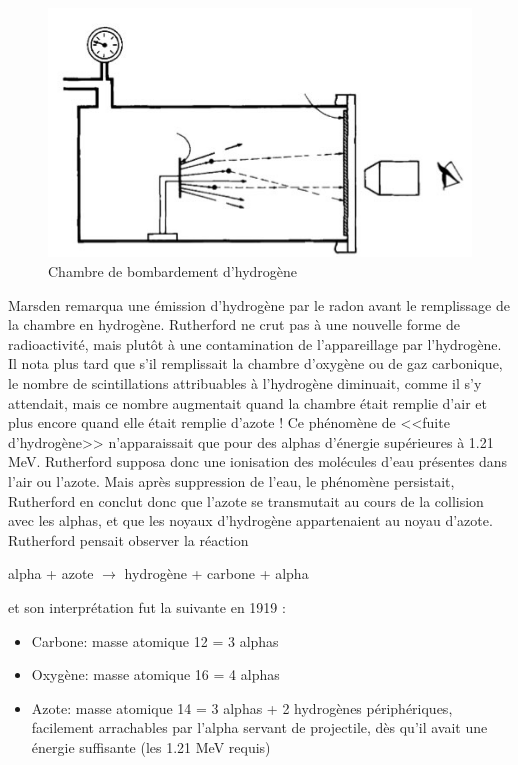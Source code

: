\begin{figure}[ht]
    \centering
    \includegraphics[scale=0.75]{Images1/bombardement.PNG}
    \caption{Chambre de bombardement d'hydrogène}
    \label{fig:chambre_bombardement_H}
\end{figure}

Marsden remarqua une émission d'hydrogène par le radon avant le remplissage de la chambre en hydrogène. Rutherford ne crut pas à une nouvelle forme de radioactivité, mais plutôt à une contamination de l'appareillage par l'hydrogène. Il nota plus tard que s'il remplissait la chambre d'oxygène ou de gaz carbonique, le nombre de scintillations attribuables à l'hydrogène diminuait, comme il s'y attendait, mais ce nombre augmentait quand la chambre était remplie d'air et plus encore quand elle était remplie d'azote ! Ce phénomène de <<fuite d'hydrogène>> n'apparaissait que pour des alphas d'énergie supérieures à 1.21 \si{MeV}. Rutherford supposa donc une ionisation des molécules d'eau présentes dans l'air ou l'azote. Mais après suppression de l'eau, le phénomène persistait, Rutherford en conclut donc que l'azote se transmutait au cours de la collision avec les alphas, et que les noyaux d'hydrogène appartenaient au noyau d'azote. Rutherford pensait observer la réaction
\begin{center}
    alpha + azote $\longrightarrow$ hydrogène + carbone + alpha
\end{center}
et son interprétation fut la suivante en 1919 :

\begin{itemize}
    \item Carbone: masse atomique 12 = 3 alphas
    \item Oxygène: masse atomique 16 = 4 alphas
    \item Azote: masse atomique 14 = 3 alphas + 2 hydrogènes périphériques, facilement arrachables par l’alpha servant de projectile, dès qu’il avait une énergie suffisante (les 1.21 \si{MeV} requis)
\end{itemize}

